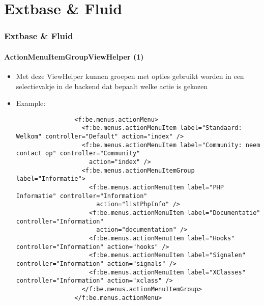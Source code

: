 %

\section{Extbase \& Fluid}


\begin{frame}[fragile]
	\frametitle{Extbase \& Fluid}
	\framesubtitle{ActionMenuItemGroupViewHelper (1)}

	\lstset{basicstyle=\tiny\ttfamily}

	\begin{itemize}

		\item Met deze ViewHelper kunnen groepen met opties gebruikt worden in een selectievakje in de backend
			dat bepaalt welke actie is gekozen

		\item Example:
			\begin{lstlisting}
				<f:be.menus.actionMenu>
				  <f:be.menus.actionMenuItem label="Standaard: Welkom" controller="Default" action="index" />
				  <f:be.menus.actionMenuItem label="Community: neem contact op" controller="Community"
				    action="index" />
				  <f:be.menus.actionMenuItemGroup label="Informatie">
				    <f:be.menus.actionMenuItem label="PHP Informatie" controller="Information"
				      action="listPhpInfo" />
				    <f:be.menus.actionMenuItem label="Documentatie" controller="Information"
				      action="documentation" />
				    <f:be.menus.actionMenuItem label="Hooks" controller="Information" action="hooks" />
				    <f:be.menus.actionMenuItem label="Signalen" controller="Information" action="signals" />
				    <f:be.menus.actionMenuItem label="XClasses" controller="Information" action="xclass" />
				  </f:be.menus.actionMenuItemGroup>
				</f:be.menus.actionMenu>
			\end{lstlisting}

	\end{itemize}

\end{frame}

